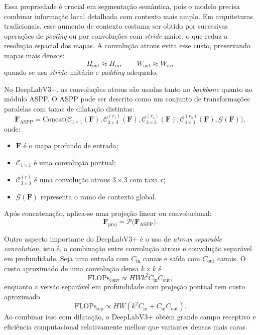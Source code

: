 \documentclass[tcc,capa]{texufpel}
\begin{document}
Essa propriedade é crucial em segmentação semântica, pois o modelo precisa combinar informação local detalhada com contexto mais amplo. Em arquiteturas tradicionais, esse aumento de contexto costuma ser obtido por sucessivas operações de \textit{pooling} ou por convoluções com \textit{stride} maior, o que reduz a resolução espacial dos mapas. A convolução atrous evita esse custo, preservando mapas mais densos:
\begin{equation}
	H_{\text{out}} \approx H_{\text{in}},
	\qquad
	W_{\text{out}} \approx W_{\text{in}},
\end{equation}
quando se usa \textit{stride} unitário e \textit{padding} adequado.

No DeepLabV3+, as convoluções atrous são usadas tanto no \textit{backbone} quanto no módulo ASPP. O ASPP pode ser descrito como um conjunto de transformações paralelas com taxas de dilatação distintas:
\begin{equation}
	\mathbf{F}_{\text{ASPP}}
	=
	\mathrm{Concat}
	\Big(
	\mathcal{C}_{1\times1}(\mathbf{F}),
	\mathcal{C}^{(r_1)}_{3\times3}(\mathbf{F}),
	\mathcal{C}^{(r_2)}_{3\times3}(\mathbf{F}),
	\mathcal{C}^{(r_3)}_{3\times3}(\mathbf{F}),
	\mathcal{G}(\mathbf{F})
	\Big),
\end{equation}
onde:
\begin{itemize}
	\item \(\mathbf{F}\) é o mapa profundo de entrada;
	\item \(\mathcal{C}_{1\times1}\) é uma convolução pontual;
	\item \(\mathcal{C}^{(r)}_{3\times3}\) é uma convolução atrous \(3\times3\) com taxa \(r\);
	\item \(\mathcal{G}(\mathbf{F})\) representa o ramo de contexto global.
\end{itemize}
Após concatenação, aplica-se uma projeção linear ou convolucional:
\begin{equation}
	\mathbf{F}_{\text{proj}} = \mathcal{P}\big(\mathbf{F}_{\text{ASPP}}\big).
\end{equation}

Outro aspecto importante do DeepLabV3+ é o uso de \textit{atrous separable convolution}, isto é, a combinação entre convolução atrous e convolução separável em profundidade. Seja uma entrada com \(C_{\text{in}}\) canais e saída com \(C_{\text{out}}\) canais. O custo aproximado de uma convolução densa \(k\times k\) é
\begin{equation}
	\text{FLOPs}_{\text{conv}}
	\propto
	H W k^2 C_{\text{in}} C_{\text{out}},
\end{equation}
enquanto a versão separável em profundidade com projeção pontual tem custo aproximado
\begin{equation}
	\text{FLOPs}_{\text{sep}}
	\propto
	H W \left(k^2 C_{\text{in}} + C_{\text{in}} C_{\text{out}}\right).
\end{equation}
Ao combinar isso com dilatação, o DeepLabV3+ obtém grande campo receptivo e eficiência computacional relativamente melhor que variantes densas mais caras.
\end{document}
